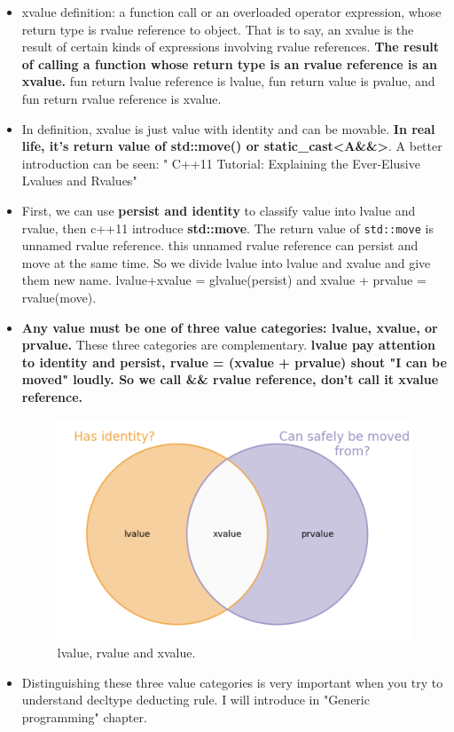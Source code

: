 \documentclass[a4paper,11pt,twoside]{book}
\begin{document}
\begin{itemize}
	\item xvalue definition: a function call or an overloaded operator expression, whose return type is rvalue reference to object. That is to say, an xvalue is the result of certain kinds of expressions involving rvalue references. \textbf{The result of calling a function whose return type is an rvalue reference is an xvalue.} fun return lvalue reference is lvalue, fun return value is pvalue, and fun return rvalue reference is xvalue.
	
	\item In definition,  xvalue is just value with identity and can be movable. \textbf{In real life, it's  return value of std::move() or static\_cast<A\&\&>}. A better introduction can be seen: " C++11 Tutorial: Explaining the Ever-Elusive Lvalues and Rvalues"
	
	
	\item First, we can use \textbf{persist and identity} to classify value into lvalue and rvalue, then c++11 introduce \textbf{std::move}. The return value of \texttt{std::move} is unnamed rvalue reference. this unnamed rvalue reference can persist and move at the same time.  So we divide lvalue into lvalue and xvalue and give them new name.  lvalue+xvalue = glvalue(persist)  and xvalue + prvalue = rvalue(move).
	
	\item \textbf{Any value must be one of three value categories: lvalue, xvalue, or prvalue.} These three categories are complementary.  \textbf{lvalue pay attention to  identity and persist, rvalue = (xvalue + prvalue) shout "I can be moved" loudly.  So we call \&\& rvalue reference, don't call it xvalue reference. }
	
	\begin{figure}[h]
		\centering
		\includegraphics[width=0.4\linewidth]{pics/xvalue1.png}
		\caption{lvalue, rvalue and xvalue.}
		\label{fig:xvalue1}
	\end{figure}
	
	
	\item Distinguishing these three value categories is very important when you try to understand decltype deducting rule. I will introduce in "Generic programming" chapter.
	

\end{itemize}
\end{document}
